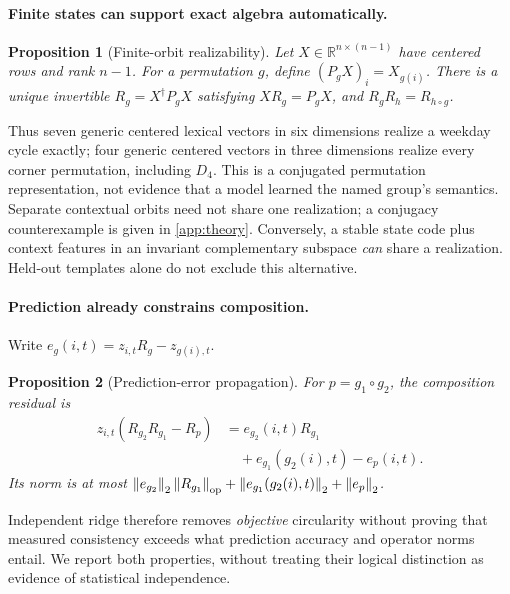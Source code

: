 \documentclass{article}
\newcommand{\R}{\mathbb{R}}
\newcommand{\norm}[1]{\left\lVert #1\right\rVert}
\newtheorem{proposition}{Proposition}
\begin{document}
\paragraph{Finite states can support exact algebra automatically.}
\begin{proposition}[Finite-orbit realizability]
\label{prop:finite}
Let $X\in\R^{n\times(n-1)}$ have centered rows and rank $n-1$. For a permutation $g$, define $(P_gX)_i=X_{g(i)}$. There is a unique invertible $R_g=X^\dagger P_gX$ satisfying $XR_g=P_gX$, and $R_gR_h=R_{h\circ g}$.
\end{proposition}
Thus seven generic centered lexical vectors in six dimensions realize a weekday cycle exactly; four generic centered vectors in three dimensions realize every corner permutation, including $D_4$. This is a conjugated permutation representation, not evidence that a model learned the named group's semantics. Separate contextual orbits need not share one realization; a conjugacy counterexample is given in \cref{app:theory}. Conversely, a stable state code plus context features in an invariant complementary subspace \emph{can} share a realization. Held-out templates alone do not exclude this alternative.

\paragraph{Prediction already constrains composition.}
Write $e_g(i,t)=z_{i,t}R_g-z_{g(i),t}$.
\begin{proposition}[Prediction-error propagation]
\label{prop:propagation}
For $p=g_1\circ g_2$, the composition residual is
\begin{align}
 z_{i,t}(R_{g_2}R_{g_1}-R_p)
 &=e_{g_2}(i,t)R_{g_1} \nonumber\\
 &\quad+e_{g_1}(g_2(i),t)-e_p(i,t).
\end{align}
Its norm is at most $\norm{e_{g_2}}_2\norm{R_{g_1}}_{\rm op}+\norm{e_{g_1}(g_2(i),t)}_2+\norm{e_p}_2$.
\end{proposition}
Independent ridge therefore removes \emph{objective} circularity without proving that measured consistency exceeds what prediction accuracy and operator norms entail. We report both properties, without treating their logical distinction as evidence of statistical independence.
\end{document}
